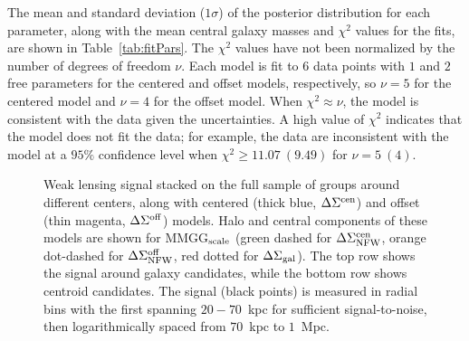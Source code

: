 \documentclass[12pt]{emulateapj}
\begin{document}
The mean and standard deviation ($1\sigma$) of the
  posterior distribution for each parameter, along with the mean
central galaxy masses and $\chi^2$ values for the fits, are shown in
Table~\ref{tab:fitPars}. The $\chi^2$ values have not
  been normalized by the number of degrees of freedom $\nu$. Each
  model is fit to $6$ data points with $1$ and $2$ free parameters for
  the centered and offset models, respectively, so $\nu=5$ for the
  centered model and $\nu=4$ for the offset model. When $\chi^2
  \approx \nu$, the model is consistent with the data given the
  uncertainties. A high value of $\chi^2$ indicates that the model
  does not fit the data; for example, the data are inconsistent with
  the model at a $95\%$ confidence level when $\chi^2 \geq
  11.07~(9.49)$ for $\nu= 5~(4)$.

\begin{figure*}[htb]
\caption{Weak lensing signal stacked on the full sample of groups
  around different centers, along with centered (thick blue,
  $\Delta\Sigma^{\rm cen}$) and offset (thin magenta,
  $\Delta\Sigma^{\rm off}$) models. Halo and central components of
  these models are shown for MMGG$_{\rm scale}$ (green dashed for
  $\Delta\Sigma^{\rm cen}_{\rm NFW}$, orange dot-dashed for
  $\Delta\Sigma^{\rm off}_{\rm NFW}$, red dotted for
  $\Delta\Sigma_{\rm gal}$). The top row shows the signal around
  galaxy candidates, while the bottom row shows centroid
  candidates. The signal (black points) is measured in radial bins
  with the first spanning $20-70$~{\rm kpc} for sufficient
  signal-to-noise, then logarithmically spaced from $70$~{\rm kpc} to
  $1$~{\rm Mpc}.}
\label{fig:full_stacks}
\end{figure*}
\end{document}
